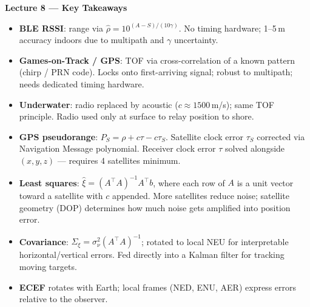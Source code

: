 \documentclass[12pt, a4paper]{article}
\begin{document}
\begin{keybox}
  \textbf{Lecture 8 --- Key Takeaways}
  \begin{itemize}[leftmargin=1.2em,itemsep=2pt]
    \item \textbf{BLE RSSI}: range via $\hat{\rho} = 10^{(A-S)/(10\gamma)}$.
      No timing hardware; 1--5\,m accuracy indoors due to multipath
      and $\gamma$ uncertainty.
    \item \textbf{Games-on-Track / GPS}: TOF via cross-correlation of a
      known pattern (chirp / PRN code). Locks onto first-arriving signal;
      robust to multipath; needs dedicated timing hardware.
    \item \textbf{Underwater}: radio replaced by acoustic
      ($c \approx 1500$\,m/s); same TOF principle. Radio used only at
      surface to relay position to shore.
    \item \textbf{GPS pseudorange}: $P_S = \rho + c\tau - c\tau_S$.
      Satellite clock error $\tau_S$ corrected via Navigation Message
      polynomial. Receiver clock error $\tau$ solved alongside
      $(x,y,z)$ --- requires 4 satellites minimum.
    \item \textbf{Least squares}: $\hat{\xi} = (A^\top A)^{-1}A^\top b$,
      where each row of $A$ is a unit vector toward a satellite with $c$
      appended. More satellites reduce noise; satellite geometry (DOP)
      determines how much noise gets amplified into position error.
    \item \textbf{Covariance}: $\Sigma_\xi = \sigma_\nu^2(A^\top A)^{-1}$;
      rotated to local NEU for interpretable horizontal/vertical errors.
      Fed directly into a Kalman filter for tracking moving targets.
    \item \textbf{ECEF} rotates with Earth; local frames (NED, ENU, AER)
      express errors relative to the observer.
  \end{itemize}
\end{keybox}
\end{document}
